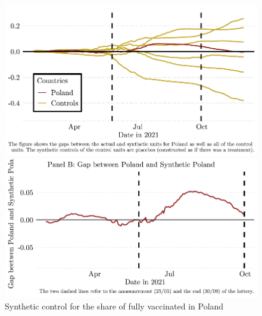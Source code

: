 \documentclass{scrbook}
\begin{document}
\begin{figure}[h]
\caption{Synthetic control for the share of fully vaccinated in Poland}

\begin{center}\includegraphics{bachelor_thesis_files/figure-latex/unnamed-chunk-4-1} \end{center}



\begin{center}\includegraphics{bachelor_thesis_files/figure-latex/unnamed-chunk-4-2} \end{center}
\end{figure}
\end{document}
